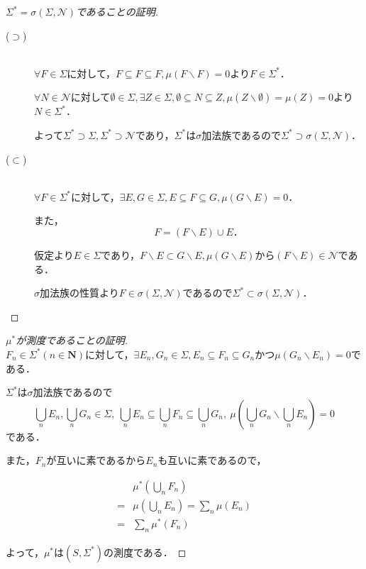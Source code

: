 \documentclass{jsarticle}
\begin{document}
\begin{proof}[$\Sigma^*=\sigma(\Sigma,\mathcal{N})$であることの証明]\mbox{}
    \begin{description}
        \item[($\supset$)]\mbox{}\\
            $\forall F\in \Sigma$に対して，$F\subseteq F\subseteq F,\mu(F\backslash F)=0$より$F\in\Sigma^*$．
            
            $\forall N\in\mathcal{N}$に対して$\emptyset\in\Sigma,\exists Z\in\Sigma,\emptyset\subseteq N\subseteq Z,\mu(Z\backslash\emptyset)=\mu(Z)=0$より$N\in\Sigma^*$．
            
            よって$\Sigma^*\supset\Sigma, \Sigma^*\supset\mathcal{N}$であり，$\Sigma^*$は$\sigma$加法族であるので$\Sigma^*\supset \sigma(\Sigma,\mathcal{N})$．
        \item[($\subset$)]\mbox{}\\
            $\forall F\in \Sigma^*$に対して，$\exists E,G\in\Sigma, E\subseteq F\subseteq G,\mu(G\backslash E)=0$．
            
            また，\begin{equation}
                F=(F\backslash E)\cup E ． \nonumber
            \end{equation}
            
            仮定より$E\in\Sigma$であり，$F\backslash E \subset G\backslash E,\mu(G\backslash E)$から$(F\backslash E)\in\mathcal{N}$である．
            
            $\sigma$加法族の性質より$F\in\sigma(\Sigma,\mathcal{N})$であるので$\Sigma^*\subset \sigma(\Sigma,\mathcal{N})$．
    \end{description}
\end{proof}

\begin{proof}[$\mu^*$が測度であることの証明]\mbox{}\\

    $F_n\in\Sigma^*(n\in\mathbf{N})$に対して，$\exists E_n,G_n\in\Sigma , E_n\subseteq F_n\subseteq G_n かつ\mu(G_n\backslash E_n)=0$である．
        
    $\Sigma^*$は$\sigma$加法族であるので
    \begin{equation}
        \bigcup_n E_n,\bigcup_n G_n \in \Sigma ,\  \bigcup_n E_n \subseteq \bigcup_n F_n \subseteq \bigcup_n G_n ,\  \mu \left( \bigcup_n G_n \backslash \bigcup_n E_n \right)=0 \nonumber
    \end{equation}である．

    また，$F_n$が互いに素であるから$E_n$も互いに素であるので，

    \begin{align}
        &\mu^*\left( \bigcup_n F_n \right) \nonumber \\
        =&\mu\left( \bigcup_n E_n \right) = \sum_n \mu(E_n) \nonumber \\
        =&\sum_n \mu^*\left( F_n \right) \nonumber
    \end{align}
    
    よって，$\mu^*$は$(S,\Sigma^*)$の測度である．
\end{proof}
\end{document}
